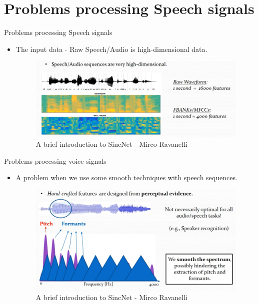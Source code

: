 \documentclass[notheorems, aspectratio=54]{beamer}
\begin{document}
\section{Problems processing Speech signals}
\begin{frame}{Problems processing Speech signals}
	\begin{itemize}
		\item The input data - Raw Speech/Audio is high-dimensional data.
		\begin{figure}[H]
			\includegraphics[width=1\linewidth]{images/capture_01.png}
			\caption{A brief introduction to SincNet - Mirco Ravanelli}
			\label{fig:writing-thesis}
		\end{figure}
	\end{itemize}
\end{frame}
\begin{frame}{Problems processing voice signals}
	\begin{itemize}
		\item A problem when we use some smooth techniques with speech sequences.
		\begin{figure}[H]
			\includegraphics[width=1\linewidth]{images/perceptual_evidence.png}
			\caption{A brief introduction to SincNet - Mirco Ravanelli}
			\label{fig:writing-thesis}
		\end{figure}
	\end{itemize}
\end{frame}
\end{document}
